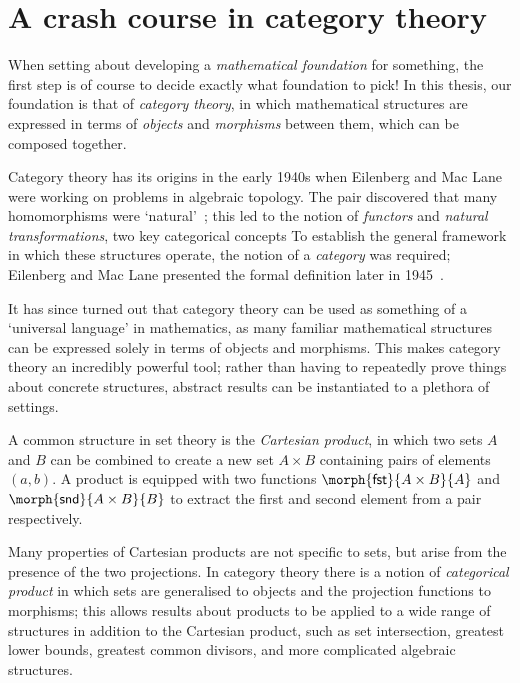\chapter{A crash course in category theory}

When setting about developing a \emph{mathematical foundation} for something,
the first step is of course to decide exactly what foundation to pick!
In this thesis, our foundation is that of \emph{category theory}, in which
mathematical structures are expressed in terms of \emph{objects} and
\emph{morphisms} between them, which can be composed together.

Category theory has its origins in the early 1940s when Eilenberg and Mac Lane
were working on problems in algebraic topology.
The pair discovered that many homomorphisms were
`natural'~\cite{eilenberg1942natural}; this led to the notion of
\emph{functors} and \emph{natural transformations}, two key categorical
concepts
To establish the general framework in which these structures operate, the notion
of a \emph{category} was required; Eilenberg and Mac Lane presented the
formal definition later in 1945~\cite{eilenberg1945general}.

It has since turned out that category theory can be used as something of a
`universal language' in mathematics, as many familiar mathematical structures
can be expressed solely in terms of objects and morphisms.
This makes category theory an incredibly powerful tool; rather than having to
repeatedly prove things about concrete structures, abstract results can be
instantiated to a plethora of settings.

\begin{example}
    A common structure in set theory is the \emph{Cartesian product}, in
    which two sets \(A\) and \(B\) can be combined to create a new set
    \(A \times B\) containing pairs of elements \((a,b)\).
    A product is equipped with two functions
    \(\morph{\mathsf{fst}}{A \times B}{A}\) and
    \(\morph{\mathsf{snd}}{A \times B}{B}\) to extract the first and second
    element from a pair respectively.

    Many properties of Cartesian products are not specific to sets,
    but arise from the presence of the two projections.
    In category theory there is a notion of \emph{categorical product} in which
    sets are generalised to objects and the projection functions to morphisms;
    this allows results about products to be applied to a wide range of
    structures in addition to the Cartesian product, such as set intersection,
    greatest lower bounds, greatest common divisors, and more complicated
    algebraic structures.
\end{example}


